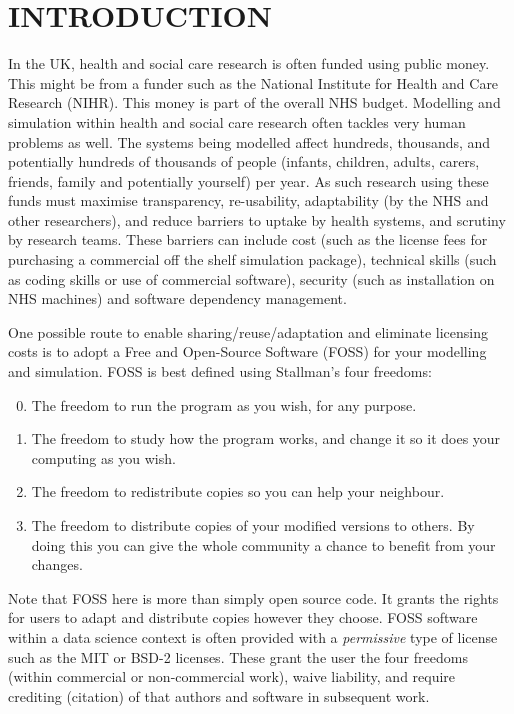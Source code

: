 \documentclass{swpaperproc}
\theoremstyle{sw}
\begin{document}

\section{INTRODUCTION}
\label{sec:intro}

In the UK, health and social care research is often funded using public money.  This might be from a funder such as the National Institute for Health and Care Research (NIHR).  This money is part of the overall NHS budget.  Modelling and simulation within health and social care research often tackles very human problems as well. The systems being modelled affect hundreds, thousands, and potentially hundreds of thousands of people (infants, children, adults, carers, friends, family and potentially yourself) per year.  As such research using these funds must maximise transparency, re-usability, adaptability (by the NHS and other researchers), and reduce barriers to uptake by health systems, and scrutiny by research teams. These barriers can include cost (such as the license fees for purchasing a commercial off the shelf simulation package), technical skills (such as coding skills or use of commercial software), security (such as installation on NHS machines) and software dependency management.

One possible route to enable sharing/reuse/adaptation and eliminate licensing costs is to adopt a Free and Open-Source Software (FOSS) for your modelling and simulation. FOSS is best defined using Stallman's four freedoms:

\begin{enumerate}
\setcounter{enumi}{-1}
    \item The freedom to run the program as you wish, for any purpose.
    \item The freedom to study how the program works, and change it so it does your computing as you wish. 
    \item The freedom to redistribute copies so you can help your neighbour.
    \item The freedom to distribute copies of your modified versions to others. By doing this you can give the whole community a chance to benefit from your changes.
\end{enumerate}

Note that FOSS here is more than simply open source code.  It grants the rights for users to adapt and distribute copies however they choose. FOSS software within a data science context is often provided with a \textit{permissive} type of license such as the MIT or BSD-2 licenses.  These grant the user the four freedoms (within commercial or non-commercial work), waive liability, and require crediting (citation) of that authors and software in subsequent work.
\end{document}
